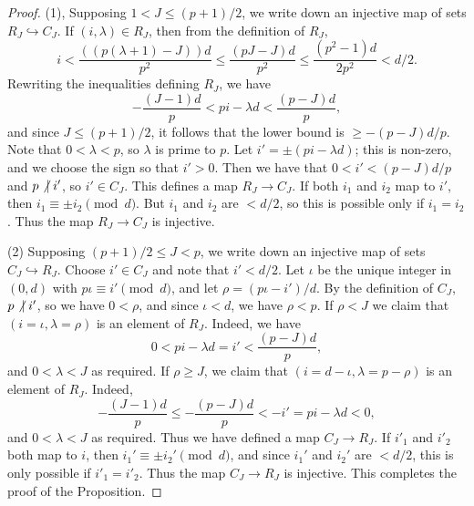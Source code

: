 \documentclass[12pt,reqno]{amsart}
\numberwithin{equation}{section}
\theoremstyle{plain}
\theoremstyle{definition}
\theoremstyle{remark}
\numberwithin{equation}{section}
\newcommand{\<}{\langle}
\renewcommand{\>}{\rangle}
\newcommand{\into}{\hookrightarrow}
\newcommand{\nodiv}{\not|}
\def\nodiv{\mathrel{\mathchoice{\not|}{\not|}{\kern-.2em\not\kern.2em|}
{\kern-.2em\not\kern.2em|}}}
\begin{document}
\begin{proof}
  (1), Supposing $1<J\le(p+1)/2$, we write down an injective map of sets
  $R_J\into C_J$. If $(i,\lambda)\in R_J$, then from the definition of  $R_J$,
  \[i<\frac{((p(\lambda+1)-J))d}{p^2}\le\frac{(pJ-J)d}{p^2}
    \le\frac{(p^2-1)d}{2p^2}<d/2.\]
  Rewriting the inequalities defining $R_J$, we have
  \[-\frac{(J-1)d}p<pi-\lambda d<\frac{(p-J)d}p,\]
  and since $J\le(p+1)/2$, it follows that
  the lower bound is $\ge -(p-J)d/p$.  Note that $0<\lambda<p$, so
  $\lambda$ is prime to $p$.  Let $i'=\pm(pi-\lambda d)$; this is
  non-zero, and we choose the sign so that $i'>0$.  Then we have that
  $0<i'<(p-J)d/p$ and $p\nodiv i'$,
  so $i'\in C_J$.  This defines a map
  $R_J\to C_J$.  If both $i_1$ and $i_2$ map to $i'$, then
  $i_1\equiv\pm i_2\pmod d$.  But $i_1$ and $i_2$ are $<d/2$, so this
  is possible only if $i_1=i_2$.  Thus the map $R_J\to C_J$ is
  injective.

  (2) Supposing $(p+1)/2\le J<p$, we write down an injective map of
  sets $C_J\into R_J$.  Choose $i'\in C_J$ and note that $i'<d/2$.
  Let $\iota$ be the unique integer in $(0,d)$ with
  $p\iota\equiv i'\pmod d$, and let $\rho=(p\iota-i')/d$.  By the
  definition of $C_J$, $p\nodiv i'$, so we have $0<\rho$, and since
  $\iota<d$, we have $\rho<p$.  If $\rho<J$ we claim that
  $(i=\iota,\lambda=\rho)$ is an element of $R_J$.  Indeed, we have
  \[ 0<pi-\lambda d=i'<\frac{(p-J)d}{p},\]
  and $0<\lambda<J$ as required.  If $\rho\ge J$, we claim that
  $(i=d-\iota,\lambda=p-\rho)$ is an element of $R_J$.  Indeed,
  \[-\frac{(J-1)d}{p}\le-\frac{(p-J)d}{p}<-i'=pi-\lambda d<0,\] and
  $0<\lambda<J$ as required.  Thus we have defined a map $C_J\to R_J$.
  If $i'_1$ and $i'_2$ both map to $i$, then
  $i_1'\equiv\pm i_2'\pmod d$, and since $i_1'$ and $i_2'$ are $<d/2$,
  this is only possible if $i'_1=i'_2$.  Thus the map $C_J\to R_J$ is
  injective. This completes the proof of the Proposition.
\end{proof}
\end{document}

